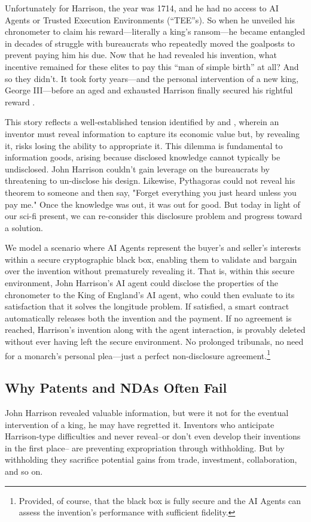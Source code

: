 \documentclass{article}
\begin{document}
	Unfortunately for Harrison, the year was 1714, and he had no access to AI Agents or Trusted Execution Environments (``TEE''s). So when he unveiled his chronometer to claim his  reward—literally a king’s ransom—he became entangled in decades of struggle with bureaucrats who repeatedly moved the goalposts to prevent paying him his due. Now that he had revealed his invention, what incentive remained for these elites to pay this “man of simple birth” at all? And so they didn't. It took forty years—and the personal intervention of a new king, George III—before an aged and exhausted Harrison finally secured his rightful reward \citep{bennett2003travels, sobel2005longitude}.

	This story reflects a well-established tension identified by \citet{arrow1971essays} and \citet{nelson1959simple}, wherein an inventor must reveal information to capture its economic value but, by revealing it, risks losing the ability to appropriate it. This dilemma is fundamental to information goods, arising because disclosed knowledge cannot typically be undisclosed. John Harrison couldn't gain leverage on the bureaucrats by threatening to un-disclose his design. Likewise, Pythagoras could not reveal his theorem to someone and then say, "Forget everything you just heard unless you pay me." Once the knowledge was out, it was out for good. But today in light of our sci-fi present, we can re-consider this disclosure problem and progress toward a solution.
    
    We model a scenario where AI Agents represent the buyer's and seller's interests within a secure cryptographic black box, enabling them to validate and bargain over the invention without prematurely revealing it. That is, within this secure environment, John Harrison’s AI agent could disclose the properties of the chronometer to the King of England’s AI agent, who could then evaluate to its satisfaction that it solves the longitude problem. If satisfied, a smart contract automatically releases both the invention and the payment. If no agreement is reached, Harrison’s invention along with the agent interaction, is provably deleted without ever having left the secure environment. No prolonged tribunals, no need for a monarch’s personal plea—just a perfect non-disclosure agreement.\footnote{Provided, of course, that the black box is fully secure and the AI Agents can assess the invention’s performance with sufficient fidelity.} 

\subsection{Why Patents and NDAs Often Fail}
John Harrison revealed valuable information, but were it not for the eventual intervention of a king, he may have regretted it. Inventors who anticipate Harrison-type difficulties and never reveal--or don't even develop their inventions in the first place-- are preventing expropriation through withholding. But by withholding they sacrifice potential gains from trade, investment, collaboration, and so on. 
\end{document}
